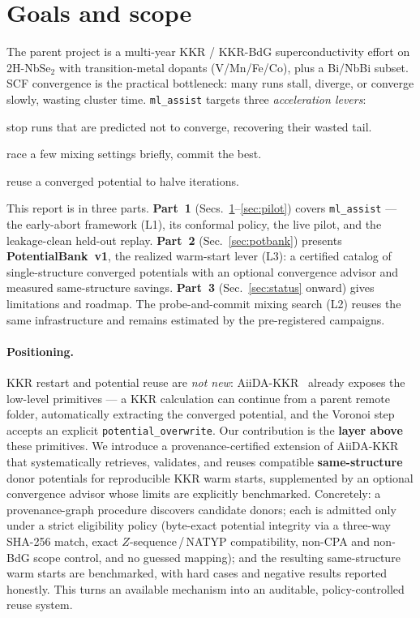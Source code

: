 \documentclass[11pt]{article}
\newcommand{\code}[1]{\texttt{#1}}
\begin{document}
\section{Goals and scope}
\label{sec:goals}
The parent project is a multi-year KKR / KKR-BdG superconductivity effort on 2H-NbSe$_2$ with
transition-metal dopants (V/Mn/Fe/Co), plus a Bi/NbBi subset. SCF convergence is the practical
bottleneck: many runs stall, diverge, or converge slowly, wasting cluster time. \code{ml\_assist} targets
three \emph{acceleration levers}:
\begin{description}[leftmargin=1.6em,itemsep=1pt]
  \item[L1 --- early abort] stop runs that are predicted not to converge, recovering their wasted tail.
  \item[L2 --- probe-and-commit mixing] race a few mixing settings briefly, commit the best.
  \item[L3 --- warm start] reuse a converged potential to halve iterations.
\end{description}
This report is in three parts. \textbf{Part~1} (Secs.~\ref{sec:goals}--\ref{sec:pilot}) covers
\code{ml\_assist} --- the early-abort framework (L1), its conformal policy, the live pilot, and the
leakage-clean held-out replay. \textbf{Part~2} (Sec.~\ref{sec:potbank}) presents \textbf{PotentialBank~v1},
the realized warm-start lever (L3): a certified catalog of single-structure converged potentials with an
optional convergence advisor and measured same-structure savings. \textbf{Part~3} (Sec.~\ref{sec:status}
onward) gives limitations and roadmap. The probe-and-commit mixing search (L2) reuses the same infrastructure
and remains estimated by the pre-registered campaigns.

\paragraph{Positioning.} KKR restart and potential reuse are \emph{not new}: AiiDA-KKR~\cite{aiidakkr} already
exposes the low-level primitives --- a KKR calculation can continue from a parent remote folder, automatically
extracting the converged potential, and the Voronoi step accepts an explicit \code{potential\_overwrite}. Our
contribution is the \textbf{layer above} these primitives. We introduce a provenance-certified extension of
AiiDA-KKR that systematically retrieves, validates, and reuses compatible \textbf{same-structure} donor
potentials for reproducible KKR warm starts, supplemented by an optional convergence advisor whose limits are
explicitly benchmarked. Concretely: a provenance-graph procedure discovers candidate donors; each is admitted
only under a strict eligibility policy (byte-exact potential integrity via a three-way SHA-256 match, exact
$Z$-sequence\,/\,NATYP compatibility, non-CPA and non-BdG scope control, and no guessed mapping); and the
resulting same-structure warm starts are benchmarked, with hard cases and negative results reported honestly.
This turns an available mechanism into an auditable, policy-controlled reuse system.
\end{document}
